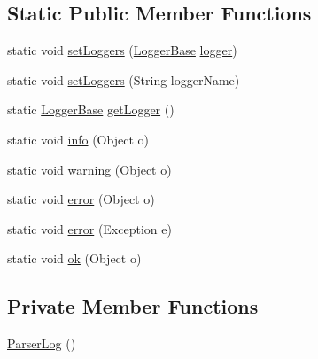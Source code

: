 \subsection*{Static Public Member Functions}
\begin{DoxyCompactItemize}
\item 
static void \hyperlink{classit_1_1emarolab_1_1cagg_1_1core_1_1language_1_1ParserLog_accdbecc64d64e8ca394e95dadc47636f}{set\-Loggers} (\hyperlink{classit_1_1emarolab_1_1cagg_1_1debugging_1_1DebuggingText_1_1LoggerBase}{Logger\-Base} \hyperlink{classit_1_1emarolab_1_1cagg_1_1core_1_1language_1_1ParserLog_a9edf0e5c8ec3d774275c915ff7bd65c4}{logger})
\item 
static void \hyperlink{classit_1_1emarolab_1_1cagg_1_1core_1_1language_1_1ParserLog_a3585f051db261f608c098bf78ae87959}{set\-Loggers} (String logger\-Name)
\item 
static \hyperlink{classit_1_1emarolab_1_1cagg_1_1debugging_1_1DebuggingText_1_1LoggerBase}{Logger\-Base} \hyperlink{classit_1_1emarolab_1_1cagg_1_1core_1_1language_1_1ParserLog_ae30ad2c63b95630dd744c49203f45adb}{get\-Logger} ()
\item 
static void \hyperlink{classit_1_1emarolab_1_1cagg_1_1core_1_1language_1_1ParserLog_a4021b117f25adb96244ff58f09d71912}{info} (Object o)
\item 
static void \hyperlink{classit_1_1emarolab_1_1cagg_1_1core_1_1language_1_1ParserLog_a7382978fb8fe5bb04c0dba07ff9d513e}{warning} (Object o)
\item 
static void \hyperlink{classit_1_1emarolab_1_1cagg_1_1core_1_1language_1_1ParserLog_a7f82b948a91ec87ee856b2f7f0fd9617}{error} (Object o)
\item 
static void \hyperlink{classit_1_1emarolab_1_1cagg_1_1core_1_1language_1_1ParserLog_aa4b3a282af072156fb5224edd103369f}{error} (Exception e)
\item 
static void \hyperlink{classit_1_1emarolab_1_1cagg_1_1core_1_1language_1_1ParserLog_ace6e7cd8f72d2aa66276b7d613e4af95}{ok} (Object o)
\end{DoxyCompactItemize}
\subsection*{Private Member Functions}
\begin{DoxyCompactItemize}
\item 
\hyperlink{classit_1_1emarolab_1_1cagg_1_1core_1_1language_1_1ParserLog_a3bac58d29cdddd839bd2b16c9d679559}{Parser\-Log} ()
\end{DoxyCompactItemize}
